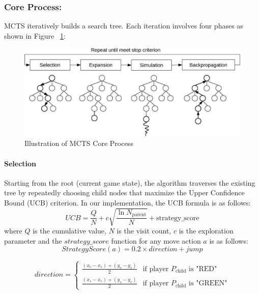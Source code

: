 \subsubsection{Core Process:} 
MCTS iteratively builds a search tree. Each iteration involves four phases as shown in Figure ~\ref{fig:mcts}:
\begin{figure}[h]
    \centering
    \includegraphics[width=1\columnwidth]{figures/mcts.png}
    \caption{Illustration of MCTS Core Process}
    \label{fig:mcts}
\end{figure}

\paragraph{Selection}
Starting from the root (current game state), the algorithm traverses the existing tree by repeatedly choosing child nodes that maximize the Upper Confidence Bound (UCB) criterion. In our implementation, the UCB formula is as follows:
\begin{equation}
    UCB = \frac{Q}{N} + c \sqrt{\frac{\ln N_{\text{parent}}}{N}} + \text{strategy\_score}
\end{equation}
where $Q$ is the cumulative value, $N$ is the visit count, $c$ is the exploration parameter and the $strategy\_score$ function for any move action $a$ is as follows:
\begin{equation}
StrategyScore(a) = 0.2 \times direction + jump
\end{equation}

\begin{equation}
direction=
\begin{cases} 
\frac{(x_e - x_s) + (y_e - y_s)}{2} & \text{if player } P_{\text{child}} \text{ is "RED"} \\
\frac{(x_s - x_e) + (y_s - y_e)}{2} & \text{if player } P_{\text{child}} \text{ is "GREEN"}
\end{cases}
\end{equation}

